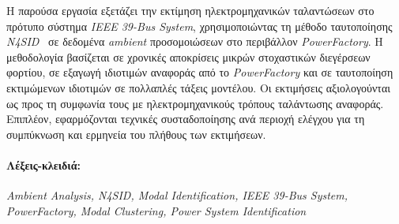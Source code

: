 Η παρούσα εργασία εξετάζει την εκτίμηση ηλεκτρομηχανικών ταλαντώσεων στο πρότυπο σύστημα \textit{IEEE 39-Bus System}, χρησιμοποιώντας τη μέθοδο ταυτοποίησης \textit{N4SID}~\cite{n4sid1994} σε δεδομένα \textit{ambient} προσομοιώσεων στο περιβάλλον \textit{PowerFactory}. Η μεθοδολογία βασίζεται σε χρονικές αποκρίσεις μικρών στοχαστικών διεγέρσεων φορτίου, σε εξαγωγή ιδιοτιμών αναφοράς από το \textit{PowerFactory} και σε ταυτοποίηση εκτιμώμενων ιδιοτιμών σε πολλαπλές τάξεις μοντέλου. Οι εκτιμήσεις αξιολογούνται ως προς τη συμφωνία τους με ηλεκτρομηχανικούς τρόπους ταλάντωσης αναφοράς. Επιπλέον, εφαρμόζονται τεχνικές συσταδοποίησης ανά περιοχή ελέγχου για τη συμπύκνωση και ερμηνεία του πλήθους των εκτιμήσεων.

\paragraph{Λέξεις-κλειδιά:} \textit{Ambient Analysis, N4SID, Modal Identification, IEEE 39-Bus System, PowerFactory, Modal Clustering, Power System Identification}
